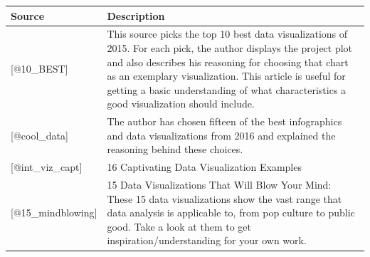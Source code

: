 \documentclass[]{book}
\theoremstyle{definition}
\theoremstyle{definition}
\theoremstyle{definition}
\theoremstyle{remark}
\begin{document}
\begin{longtable}[]{@{}ll@{}}
\toprule
\begin{minipage}[b]{0.15\columnwidth}\raggedright\strut
\textbf{Source}\strut
\end{minipage} & \begin{minipage}[b]{0.79\columnwidth}\raggedright\strut
\textbf{Description}\strut
\end{minipage}\tabularnewline
\midrule
\endhead
\begin{minipage}[t]{0.15\columnwidth}\raggedright\strut
{[}@10\_BEST{]}\strut
\end{minipage} & \begin{minipage}[t]{0.79\columnwidth}\raggedright\strut
This source picks the top 10 best data visualizations of 2015. For each
pick, the author displays the project plot and also describes his
reasoning for choosing that chart as an exemplary visualization. This
article is useful for getting a basic understanding of what
characteristics a good visualization should include.\strut
\end{minipage}\tabularnewline
\begin{minipage}[t]{0.15\columnwidth}\raggedright\strut
{[}@cool\_data{]}\strut
\end{minipage} & \begin{minipage}[t]{0.79\columnwidth}\raggedright\strut
The author has chosen fifteen of the best infographics and data
visualizations from 2016 and explained the reasoning behind these
choices.\strut
\end{minipage}\tabularnewline
\begin{minipage}[t]{0.15\columnwidth}\raggedright\strut
{[}@int\_viz\_capt{]}\strut
\end{minipage} & \begin{minipage}[t]{0.79\columnwidth}\raggedright\strut
16 Captivating Data Visualization Examples\strut
\end{minipage}\tabularnewline
\begin{minipage}[t]{0.15\columnwidth}\raggedright\strut
{[}@15\_mindblowing{]}\strut
\end{minipage} & \begin{minipage}[t]{0.79\columnwidth}\raggedright\strut
15 Data Visualizations That Will Blow Your Mind: These 15 data
visualizations show the vast range that data analysis is applicable to,
from pop culture to public good. Take a look at them to get
inspiration/understanding for your own work.\strut
\end{minipage}\tabularnewline

\end{longtable}
\end{document}
